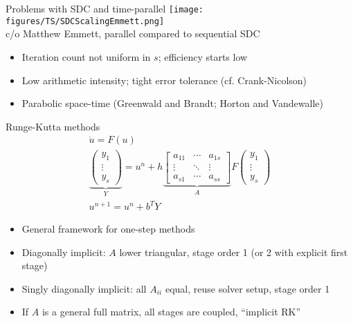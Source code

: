 \documentclass{beamer}
\begin{document}
\begin{frame}{Problems with SDC and time-parallel}
  \texttt{[image: figures/TS/SDCScalingEmmett.png]} \\
  c/o Matthew Emmett, parallel compared to sequential SDC
  \begin{itemize}
  \item Iteration count not uniform in $s$; efficiency starts low
  \item Low arithmetic intensity; tight error tolerance (cf. Crank-Nicolson)
  \item Parabolic space-time (Greenwald and Brandt; Horton and Vandewalle)
  \end{itemize}
\end{frame}

\begin{frame}{Runge-Kutta methods}
  \begin{gather*}
    \dot u = F(u) \\
    \underbrace{
    \begin{pmatrix}
      y_1 \\
      \vdots \\
      y_s
    \end{pmatrix}}_Y =
    u^{n} + h
    \underbrace{
    \begin{bmatrix}
      a_{11} & \dotsb & a_{1s} \\
      \vdots & \ddots & \vdots \\
      a_{s1} & \dotsb & a_{ss}
    \end{bmatrix}}_A
    F
    \begin{pmatrix}
      y_1 \\
      \vdots \\
      y_s
    \end{pmatrix} \\
    u^{n+1} = u^n + b^T Y
  \end{gather*}
  \begin{itemize}
  \item General framework for one-step methods
  \item Diagonally implicit: $A$ lower triangular, stage order 1 (or 2 with explicit first stage)
  \item Singly diagonally implicit: all $A_{ii}$ equal, reuse solver setup, stage order 1
  \item If $A$ is a general full matrix, all stages are coupled, ``implicit RK''
  \end{itemize}
\end{frame}
\end{document}
